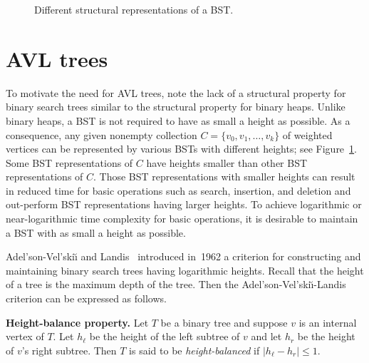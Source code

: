 \begin{figure}[!htbp]
\centering
{}

\caption{Different structural representations of a BST.}
\label{fig:tree_data_structures:BST_different_structural_representations}
\end{figure}



\section{AVL trees}

To motivate the need for AVL trees, note the lack of a
structural property for binary search trees
similar to the structural
property for binary heaps. Unlike binary heaps, a
BST is not required to have as small a height as possible. As a
consequence, any given nonempty collection
$C = \{v_0, v_1, \dots, v_k\}$ of weighted vertices can be represented
by various BSTs with different heights; see
Figure~\ref{fig:tree_data_structures:BST_different_structural_representations}.
Some BST representations of $C$ have heights smaller than other BST
representations of $C$. Those BST representations with smaller heights
can result in reduced time for basic operations such as search,
insertion, and deletion and out-perform BST representations having
larger heights. To achieve logarithmic or near-logarithmic time
complexity for basic operations, it is desirable to maintain a BST
with as small a height as possible.

Adel'son-Vel'ski\u{\i} and
Landis~\cite{AdelsonVelskiiLandis1962}
introduced in~1962 a criterion for constructing and maintaining binary
search trees having logarithmic heights. Recall that the height of a
tree is the maximum depth of the tree. Then the
Adel'son-Vel'ski\u{\i}-Landis criterion can be expressed as follows.

\begin{definition}
\textbf{Height-balance property.}
Let $T$ be a binary tree and suppose $v$ is an internal vertex of
$T$. Let $h_\ell$ be the height of the left subtree of $v$ and let
$h_r$ be the height of $v$'s right subtree. Then $T$ is said to be
\emph{height-balanced} if $|h_\ell - h_r| \leq 1$.
\end{definition}

